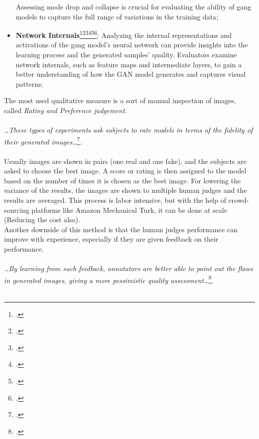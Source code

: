 \begin{itemize}
    Assessing mode drop and collapse is crucial for evaluating the ability of \gls{gang} models to capture the full range of variations in the training data;
    \item \textbf{Network Internals}\footcite{paper:netint}\footcite{paper:netint1}\footcite{paper:netint2}\footcite{paper:netint3}\footcite{paper:netint4}\footcite{paper:netint5}: 
    Analyzing the internal representations and activations of the \gls{gang} model's neural network can provide insights into the learning process and the generated samples' quality. 
    Evaluators examine network internals, such as feature maps and intermediate layers, to gain a better understanding of how the GAN model generates and captures visual patterns;
\end{itemize}
The most used qualitative measure is a sort of manual inspection of images, called \emph{Rating and Preference judgement}.\\\\
\emph{\dots These types of experiments ask subjects to rate models in terms of the fidelity of their generated images\dots}\footcite{paper:ganeval}.\\\\
Usually images are shown in pairs (one real and one fake), and the subjects are asked to choose the best image.
A score or rating is then assigned to the model based on the number of times it is chosen as the best image.
For lowering the variance of the results, the images are shown to multiple human judges and the results are averaged.
This process is labor intensive, but with the help of crowd-sourcing platforms like Amazon Mechanical Turk, 
it can be done at scale (Reducing the cost also).\\
Another downside of this method is that the human judges performance can improve with experience, especially if they are given feedback on their performance.\\\\
\emph{\dots By learning from such feedback, annotators are better able to point out the flaws in generated images, giving a more pessimistic quality assessment\dots}\footcite{paper:ganeval}.\\\\
